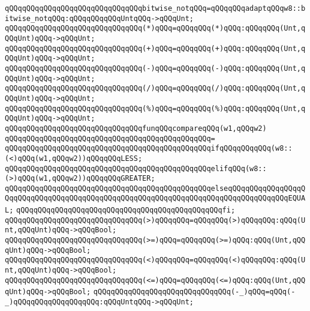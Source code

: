\newline
\verb|qQQqqQQqqQQqqQQqqQQqqQQqqQQqqQQqbitwise_notqQQq=qQQqqQQqadaptqQQqw8::bitwise_notqQQq:qQQqqQQqqQQqUntqQQq->qQQqUnt;|\newline
\newline
\verb|qQQqqQQqqQQqqQQqqQQqqQQqqQQqqQQq(*)qQQq=qQQqqQQq(*)qQQq:qQQqqQQq(Unt,qQQqUnt)qQQq->qQQqUnt;|\newline
\verb|qQQqqQQqqQQqqQQqqQQqqQQqqQQqqQQq(+)qQQq=qQQqqQQq(+)qQQq:qQQqqQQq(Unt,qQQqUnt)qQQq->qQQqUnt;|\newline
\verb|qQQqqQQqqQQqqQQqqQQqqQQqqQQqqQQq(-)qQQq=qQQqqQQq(-)qQQq:qQQqqQQq(Unt,qQQqUnt)qQQq->qQQqUnt;|\newline
\verb|qQQqqQQqqQQqqQQqqQQqqQQqqQQqqQQq(/)qQQq=qQQqqQQq(/)qQQq:qQQqqQQq(Unt,qQQqUnt)qQQq->qQQqUnt;|\newline
\verb|qQQqqQQqqQQqqQQqqQQqqQQqqQQqqQQq(%)qQQq=qQQqqQQq(%)qQQq:qQQqqQQq(Unt,qQQqUnt)qQQq->qQQqUnt;|\newline
\newline
\verb|qQQqqQQqqQQqqQQqqQQqqQQqqQQqqQQqfunqQQqcompareqQQq(w1,qQQqw2)|\newline
\verb|qQQqqQQqqQQqqQQqqQQqqQQqqQQqqQQqqQQqqQQqqQQqqQQq=|\newline
\verb|qQQqqQQqqQQqqQQqqQQqqQQqqQQqqQQqqQQqqQQqqQQqqQQqifqQQqqQQqqQQq(w8::(<)qQQq(w1,qQQqw2))qQQqqQQqLESS;|\newline
\verb|qQQqqQQqqQQqqQQqqQQqqQQqqQQqqQQqqQQqqQQqqQQqqQQqelifqQQq(w8::(>)qQQq(w1,qQQqw2))qQQqqQQqGREATER;|\newline
\verb|qQQqqQQqqQQqqQQqqQQqqQQqqQQqqQQqqQQqqQQqqQQqqQQqelseqQQqqQQqqQQqqQQqqQQqqQQqqQQqqQQqqQQqqQQqqQQqqQQqqQQqqQQqqQQqqQQqqQQqqQQqqQQqqQQqqQQqEQUAL;|\newline
\verb|qQQqqQQqqQQqqQQqqQQqqQQqqQQqqQQqqQQqqQQqqQQqqQQqfi;|\newline
\newline
\verb|qQQqqQQqqQQqqQQqqQQqqQQqqQQqqQQq(>)qQQqqQQq=qQQqqQQq(>)qQQqqQQq:qQQq(Unt,qQQqUnt)qQQq->qQQqBool;|\newline
\verb|qQQqqQQqqQQqqQQqqQQqqQQqqQQqqQQq(>=)qQQq=qQQqqQQq(>=)qQQq:qQQq(Unt,qQQqUnt)qQQq->qQQqBool;|\newline
\verb|qQQqqQQqqQQqqQQqqQQqqQQqqQQqqQQq(<)qQQqqQQq=qQQqqQQq(<)qQQqqQQq:qQQq(Unt,qQQqUnt)qQQq->qQQqBool;|\newline
\verb|qQQqqQQqqQQqqQQqqQQqqQQqqQQqqQQq(<=)qQQq=qQQqqQQq(<=)qQQq:qQQq(Unt,qQQqUnt)qQQq->qQQqBool;|\newline
\newline
\verb|qQQqqQQqqQQqqQQqqQQqqQQqqQQqqQQq(-_)qQQq=qQQq(-_)qQQqqQQqqQQqqQQqqQQq:qQQqUntqQQq->qQQqUnt;|\newline
